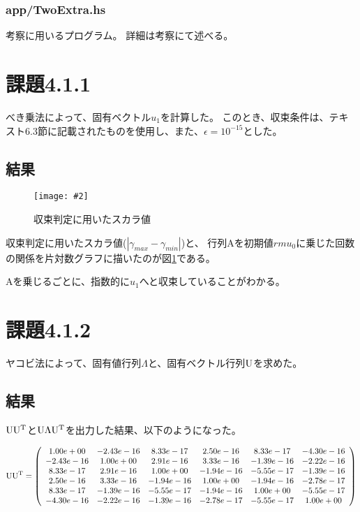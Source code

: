 \documentclass[11pt]{jsarticle}
\newcommand{\fg}[3]{ %
    \begin{figure}
        \centering
        \texttt{[image: \#2]}
        \caption{#3}
        \label{#1}
    \end{figure}
}
\newcommand{\fr}[1]{図\ref{#1}}
\begin{document}
\subsubsection*{app/TwoExtra.hs}
考察に用いるプログラム。
詳細は考察にて述べる。


\section{課題4.1.1}
べき乗法によって、固有ベクトル$u_1$を計算した。
このとき、収束条件は、テキスト6.3節に記載されたものを使用し、また、$\epsilon = 10 ^ {-15}$とした。
\subsection{結果}
\fg{fig1}{graph/4_1_1.png}{収束判定に用いたスカラ値}

収束判定に用いたスカラ値($\left| \gamma_{max} - \gamma_{min} \right|$)と、
行列Aを初期値${rm u_0}$に乗じた回数の関係を片対数グラフに描いたのが\fr{fig1}である。

Aを乗じるごとに、指数的に$u_1$へと収束していることがわかる。

\section{課題4.1.2}
ヤコビ法によって、固有値行列$\Lambda$と、固有ベクトル行列${\rm U}$を求めた。

\subsection{結果}

${\rm U} {\rm U}^{\rm T}$と${\rm U}\Lambda{\rm U}^{\rm T}$を出力した結果、以下のようになった。

\[
    {\rm U} {\rm U}^{\rm T} =
    \left(\begin{array}{cccccc}
        1.00e+00&-2.43e-16&8.33e-17&2.50e-16&8.33e-17&-4.30e-16\\
        -2.43e-16&1.00e+00&2.91e-16&3.33e-16&-1.39e-16&-2.22e-16\\
        8.33e-17&2.91e-16&1.00e+00&-1.94e-16&-5.55e-17&-1.39e-16\\
        2.50e-16&3.33e-16&-1.94e-16&1.00e+00&-1.94e-16&-2.78e-17\\
        8.33e-17&-1.39e-16&-5.55e-17&-1.94e-16&1.00e+00&-5.55e-17\\
        -4.30e-16&-2.22e-16&-1.39e-16&-2.78e-17&-5.55e-17&1.00e+00\\
    \end{array}\right)
\]
\end{document}
